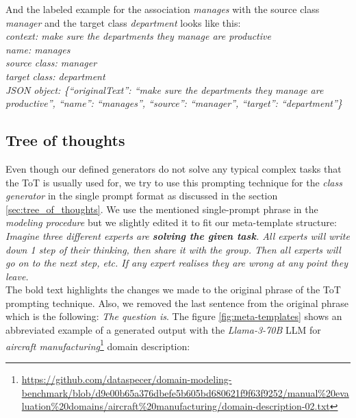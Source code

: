 \noindent{}And the labeled example for the association \textit{manages} with the source class \textit{manager} and the target class \textit{department} looks like this: \\

\noindent{}\textit{context: make sure the departments they manage are productive} \\
\textit{name: manages} \\
\textit{source class: manager} \\
\textit{target class: department} \\
\textit{JSON object: \{``originalText'': ``make sure the departments they manage are productive'', ``name'': ``manages'', ``source'': ``manager'', ``target'': ``department''\}}


\subsection{Tree of thoughts}

Even though our defined generators do not solve any typical complex tasks that the ToT is usually used for, we try to use this prompting technique for the \emph{class generator} in the single prompt format as discussed in the section \ref{sec:tree_of_thoughts}. We use the mentioned single-prompt phrase in the \emph{modeling procedure} but we slightly edited it to fit our meta-template structure: \\

\noindent{}\textit{Imagine three different experts are \textbf{solving the given task}. All experts will write down 1 step of their thinking, then share it with the group. Then all experts will go on to the next step, etc. If any expert realises they are wrong at any point they leave.} \\

\noindent{}The bold text highlights the changes we made to the original phrase of the ToT prompting technique. Also, we removed the last sentence from the original phrase which is the following: \textit{The question is}. The figure \ref{fig:meta-templates} shows an abbreviated example of a generated output with the \emph{Llama-3-70B} LLM for \textit{aircraft manufacturing}\footnote{\url{https://github.com/dataspecer/domain-modeling-benchmark/blob/d9e00b65a376dbefe5b605bd680621f9f63f9252/manual\%20evaluation\%20domains/aircraft\%20manufacturing/domain-description-02.txt}} domain description: \\


